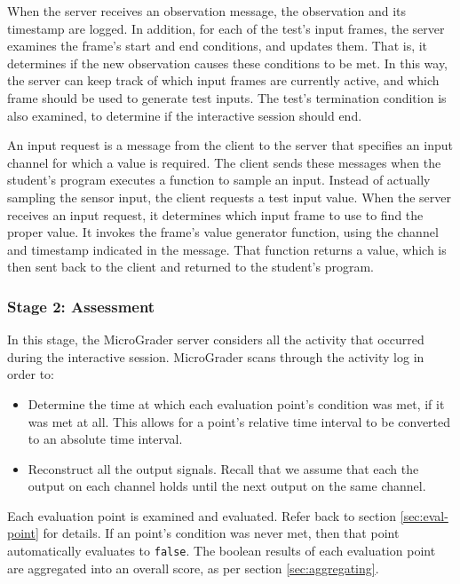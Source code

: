 \documentclass[12pt]{article}
\begin{document}
When the server receives an observation message, the observation and its timestamp are logged.  In addition, for each of the test's input frames, the server examines the frame's start and end conditions, and updates them.  That is, it determines if the new observation causes these conditions to be met.  In this way, the server can keep track of which input frames are currently active, and which frame should be used to generate test inputs.  The test's termination condition is also examined, to determine if the interactive session should end.

An input request is a message from the client to the server that specifies an input channel for which a value is required.  The client sends these messages when the student's program executes a function to sample an input.  Instead of actually sampling the sensor input, the client requests a test input value.  When the server receives an input request, it determines which input frame to use to find the proper value.  It invokes the frame's value generator function, using the channel and timestamp indicated in the message.  That function returns a value, which is then sent back to the client and returned to the student's program.

\subsubsection{Stage 2: Assessment}
In this stage, the MicroGrader server considers all the activity that occurred during the interactive session.  MicroGrader scans through the activity log in order to:

\begin{itemize}
\item Determine the time at which each evaluation point's condition was met, if it was met at all.  This allows for a point's relative time interval to be converted to an absolute time interval.
\item Reconstruct all the output signals.  Recall that we assume that each the output on each channel holds until the next output on the same channel.
\end{itemize}

Each evaluation point is examined and evaluated.  Refer back to section \ref{sec:eval-point} for details.  If an point's condition was never met, then that point automatically evaluates to \texttt{false}.  The boolean results of each evaluation point are aggregated into an overall score, as per section \ref{sec:aggregating}.
\end{document}
